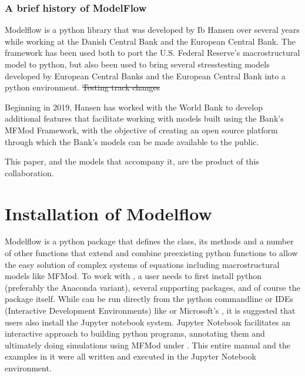 \documentclass[letterpaper,10pt,english]{jupyterBook}
\providecommand{\DIFdeltex}[1]{{\protect\color{red}\sout{#1}}}                      %
\providecommand{\DIFdelbegin}{} %
\providecommand{\DIFdelend}{} %
\providecommand{\DIFdel}[1]{\texorpdfstring{\DIFdeltex{#1}}{}} %
\begin{document}
\begin{sphinxShadowBox}
\sphinxstylesidebartitle{}
\subsubsection*{A brief history of ModelFlow}

\sphinxAtStartPar
Modelflow is a python library that was developed by Ib Hansen over several years while working at the Danish Central Bank and the European Central Bank. The framework has been used both to port the U.S. Federal Reserve’s macro\sphinxhyphen{}structural  model to python, but also been used to bring several stress\sphinxhyphen{}testing models developed by European Central Banks and the European Central Bank into a python environment.
\DIFdelbegin \DIFdel{Testing track changes
}\DIFdelend 

\sphinxAtStartPar
Beginning in 2019, Hansen has worked with the World Bank to develop additional features that facilitate working with models built using the Bank’s MFMod Framework, with the objective of creating an open source platform through which the Bank’s models can be made available to the public.

\sphinxAtStartPar
This paper, and the models that accompany it, are the product of this collaboration.
\end{sphinxShadowBox}

\sphinxstepscope


\section{Installation of Modelflow}
\label{\detokenize{content/03_Installation/InstallingPython:installation-of-modelflow}}\label{\detokenize{content/03_Installation/InstallingPython::doc}}
\sphinxAtStartPar
Modelflow is a python package that defines the  class, its methods and a number of other functions that extend and combine pre\sphinxhyphen{}existing python functions to allow the easy solution of complex systems of equations including macro\sphinxhyphen{}structural models like MFMod.  To work with , a user needs to first install python (preferably the Anaconda variant), several supporting packages, and of course the  package itself.  While  can be run directly from the python command\sphinxhyphen{}line or IDEs (Interactive Development Environments) like  or Microsoft’s , it is suggested that users also install the Jupyter notebook system. Jupyter Notebook facilitates an interactive approach to building python programs, annotating them and ultimately doing simulations using MFMod under . This entire manual and the examples in it were all written and executed in the Jupyter Notebook environment.
\end{document}
